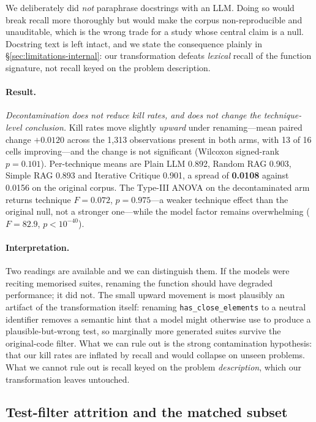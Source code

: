\documentclass[smallextended]{svjour3}
\begin{document}
We deliberately did \emph{not} paraphrase docstrings with an LLM.
Doing so would break recall more thoroughly but would make the corpus
non-reproducible and unauditable, which is the wrong trade for a
study whose central claim is a null. Docstring text is left intact,
and we state the consequence plainly in
\S\ref{sec:limitations-internal}: our transformation defeats
\emph{lexical} recall of the function signature, not recall keyed on
the problem description.

\paragraph{Result.} \emph{Decontamination does not reduce kill rates,
and does not change the technique-level conclusion.} Kill rates move
slightly \emph{upward} under renaming---mean paired change
$+0.0120$ across the 1{,}313 observations present in both arms, with
13 of 16 cells improving---and the change is not significant
(Wilcoxon signed-rank $p = 0.101$). Per-technique means are Plain LLM
0.892, Random RAG 0.903, Simple RAG 0.893 and Iterative Critique
0.901, a spread of \textbf{0.0108} against 0.0156 on the original
corpus. The Type-III ANOVA on the decontaminated arm returns technique
$F = 0.072$, $p = 0.975$---a weaker technique effect than the original
null, not a stronger one---while the model factor remains
overwhelming ($F = 82.9$, $p < 10^{-40}$).

\paragraph{Interpretation.} Two readings are available and we can
distinguish them. If the models were reciting memorised suites,
renaming the function should have degraded performance; it did not.
The small upward movement is most plausibly an artifact of the
transformation itself: renaming \texttt{has\_close\_elements} to a
neutral identifier removes a semantic hint that a model might
otherwise use to produce a plausible-but-wrong test, so marginally
more generated suites survive the original-code filter. What we can
rule out is the strong contamination hypothesis: that our kill rates
are inflated by recall and would collapse on unseen problems. What we
cannot rule out is recall keyed on the problem \emph{description},
which our transformation leaves untouched.

\subsection{Test-filter attrition and the matched subset}
\label{sec:results-attrition}
\end{document}
